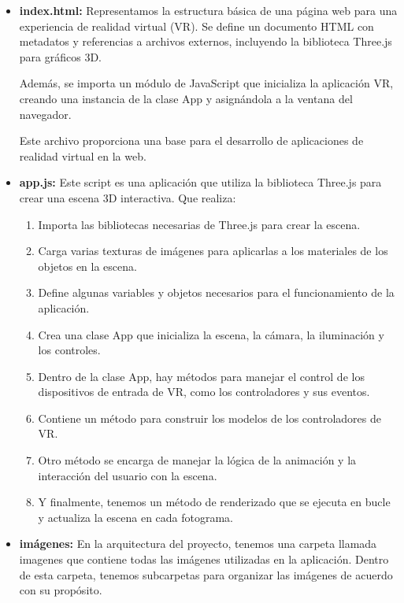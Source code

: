 \documentclass[a4paper, 12pt]{book}
\begin{document}
\begin{itemize}
  \item \textbf{index.html:} Representamos la estructura básica de una página web para una experiencia de realidad virtual (VR). 
  Se define un documento HTML con metadatos y referencias a archivos externos, incluyendo la biblioteca Three.js para gráficos 3D. 
  
  Además, se importa un módulo de JavaScript que inicializa la aplicación VR, creando una instancia de la clase App y asignándola a la ventana del navegador. 
  
  Este archivo proporciona una base para el desarrollo de aplicaciones de realidad virtual en la web.
  
  \item \textbf{app.js:} Este script es una aplicación que utiliza la biblioteca Three.js para crear una escena 3D interactiva. Que realiza:
    
    \begin{enumerate}
      \item Importa las bibliotecas necesarias de Three.js para crear la escena.
      \item Carga varias texturas de imágenes para aplicarlas a los materiales de los objetos en la escena.
      \item Define algunas variables y objetos necesarios para el funcionamiento de la aplicación.
      \item Crea una clase App que inicializa la escena, la cámara, la iluminación y los controles.
      \item Dentro de la clase App, hay métodos para manejar el control de los dispositivos de entrada de VR, como los controladores y sus eventos.
      \item Contiene un método para construir los modelos de los controladores de VR.
      \item Otro método se encarga de manejar la lógica de la animación y la interacción del usuario con la escena.
      \item Y finalmente, tenemos un método de renderizado que se ejecuta en bucle y actualiza la escena en cada fotograma.
    \end{enumerate}

  \item \textbf{imágenes:} En la arquitectura del proyecto, tenemos una carpeta llamada imagenes que contiene todas las imágenes utilizadas en la aplicación. 
  Dentro de esta carpeta, tenemos subcarpetas para organizar las imágenes de acuerdo con su propósito.


\end{itemize}
\end{document}

